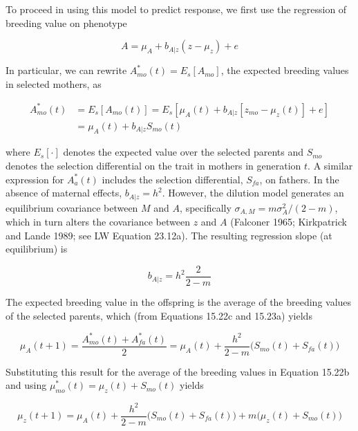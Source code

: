 \documentclass{article}
\begin{document}
To proceed in using this model to predict response, we first use the regression of breeding value on phenotype

\begin{equation}
A=\mu_{A}+b_{A|z}\left(z-\mu_{z}\right)+e
\end{equation}

In particular, we can rewrite  $ A_{mo}^{*}(t) = E_{s}[A_{mo}] $, the expected breeding values in selected mothers, as

\begin{equation}
\begin{aligned}A_{mo}^{*}(t)&=E_{s}[A_{mo}(t)]=E_{s}\left[\mu_{A}(t)+b_{A|z}\left[z_{mo}-\mu_{z}(t)\right]+e\right]\\&=\mu_{A}(t)+b_{A|z}S_{mo}(t)\end{aligned}
\tag{15.22c}
\label{eq:15_22c}
\end{equation}

where  $ E_s[\cdot] $ denotes the expected value over the selected parents and  $ S_{mo} $ denotes the selection differential on the trait in mothers in generation  $ t $. A similar expression for  $ A_a^*(t) $ includes the selection differential,  $ S_{fa} $, on fathers. In the absence of maternal effects,  $ b_{A|z} = h^2 $. However, the dilution model generates an equilibrium covariance between  $ M $ and  $ A $, specifically  $ \sigma_{A,M} = m \sigma_A^2 / (2 - m) $, which in turn alters the covariance between  $ z $ and  $ A $ (Falconer 1965; Kirkpatrick and Lande 1989; see LW Equation 23.12a). The resulting regression slope (at equilibrium) is

\begin{equation}
b_{A|z}=h^{2}\frac{2}{2-m}
\tag{15.23a}
\label{eq:15_23a}
\end{equation}

The expected breeding value in the offspring is the average of the breeding values of the selected parents, which (from Equations 15.22c and 15.23a) yields

\begin{equation}
\mu_{A}(t+1)=\frac{A_{m o}^{*}(t)+A_{f a}^{*}(t)}{2}=\mu_{A}(t)+\frac{h^{2}}{2-m}\Biggl(S_{m o}(t)+S_{f a}(t)\Biggr)
\tag{15.23b}
\label{eq:15_23b}
\end{equation}

Substituting this result for the average of the breeding values in Equation 15.22b and using  $ \mu_{mo}^{*}(t) = \mu_{z}(t) + S_{mo}(t) $ yields

\begin{equation}
\mu_{z}(t+1)=\mu_{A}(t)+\frac{h^{2}}{2-m}\Biggl(S_{m o}(t)+S_{f a}(t)\Biggr)+m\Biggl(\mu_{z}(t)+S_{m o}(t)\Biggr)
\tag{15.24}
\label{eq:15_24}
\end{equation}
\end{document}
